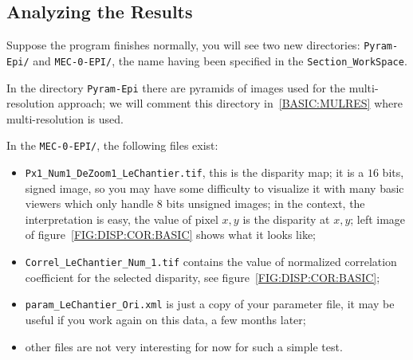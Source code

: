 \subsection{Analyzing the Results }

Suppose the program finishes normally, you will see two new
directories: {\tt Pyram-Epi/} and {\tt MEC-0-EPI/}, the name having
been  specified in the {\tt Section\_WorkSpace}.


In the directory {\tt Pyram-Epi} there are pyramids
of images used for the multi-resolution approach; we will comment this
directory in~\ref{BASIC:MULRES} where multi-resolution is used.

In the {\tt MEC-0-EPI/}, the following files exist:

\begin{itemize}

   \item {\tt Px1\_Num1\_DeZoom1\_LeChantier.tif}, this is the disparity map;
         it is a $16$ bits, signed image, so you may have some difficulty to
         visualize it with many basic viewers which only handle $8$ bits unsigned images;
         in the context, the interpretation is
         easy, the value of pixel $x,y$ is the disparity at $x,y$;
         left image of figure~\ref{FIG:DISP:COR:BASIC} shows what it looks like;

    \item {\tt Correl\_LeChantier\_Num\_1.tif} contains the value of normalized
         correlation coefficient for the selected disparity, see figure~\ref{FIG:DISP:COR:BASIC};

     \item {\tt param\_LeChantier\_Ori.xml} is just a copy of your parameter file,
           it may be useful if you work again on this data, a few months later;

     \item other files are not very interesting for now for such a simple test.
\end{itemize}

